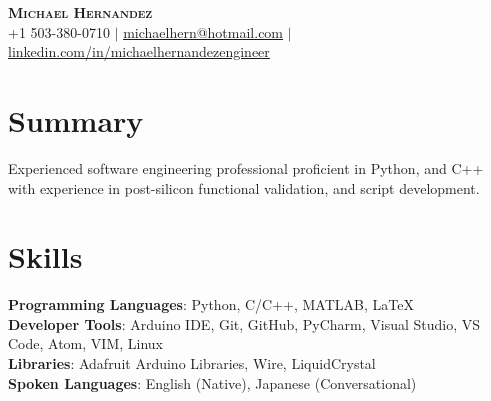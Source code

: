 \documentclass[letterpaper,11pt]{article}
\begin{document}

\begin{center}
    \textbf{\Huge \scshape Michael Hernandez} \\ \vspace{1pt}
    \small +1 503-380-0710 $|$ \href{mailto:michaelhern@hotmail.com}{\underline{michaelhern@hotmail.com}} $|$ 
    \href{https://linkedin.com/in/...}{\underline{linkedin.com/in/michaelhernandezengineer}} %
\end{center}

\section{Summary}
\begin{itemize}[leftmargin=0.15in, label={}]
	\small{\item{Experienced software engineering professional proficient in Python, and C++ with experience in post-silicon functional validation, and  script development.}}
\end{itemize}

%
\section{Skills}
\begin{itemize}[leftmargin=0.15in, label={}]
	\small{\item{
			\textbf{Programming Languages}{: 
				Python, 
				C/C++, 
				MATLAB, 
				LaTeX
				} \\
			\textbf{Developer Tools}{: 
				Arduino IDE,
				Git, 
				GitHub, 
				PyCharm, 
				Visual Studio, 
				VS Code, 
				Atom, 
				VIM,
				Linux
				} \\
			\textbf{Libraries}{: 
				Adafruit Arduino Libraries, 
				Wire, 
				LiquidCrystal
				} \\
			\textbf{Spoken Languages}{: 
				English (Native), 
				Japanese (Conversational)
				}
	}}
\end{itemize}
\end{document}
